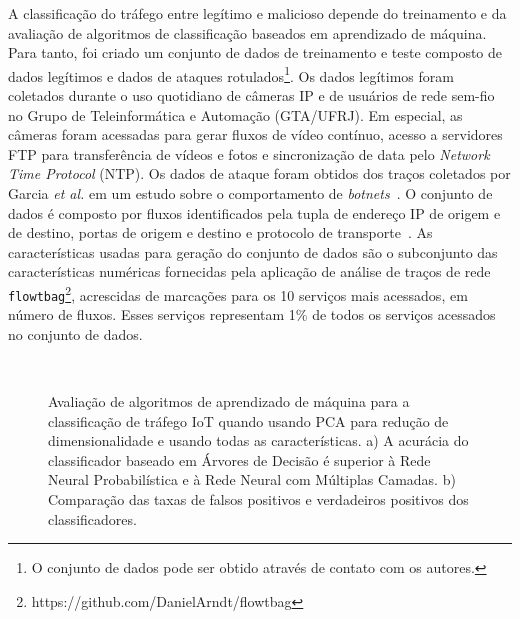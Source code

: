 \documentclass[12pt]{article}
\begin{document}
A classificação do tráfego entre legítimo e malicioso depende do treinamento e da avaliação de algoritmos de classificação baseados em aprendizado de máquina. Para tanto, foi criado um conjunto de dados de treinamento e teste composto de dados legítimos e dados de ataques rotulados\footnote{O conjunto de dados pode ser obtido através de contato com os autores.}. Os dados legítimos foram coletados durante o uso quotidiano de câmeras IP e de usuários de rede sem-fio no Grupo de Teleinformática e Automação (GTA/UFRJ). Em especial, as câmeras foram acessadas para gerar fluxos de vídeo contínuo, acesso a servidores FTP para transferência de vídeos e fotos e sincronização de data pelo {\it Network Time Protocol} (NTP). Os dados de ataque foram obtidos dos traços coletados por Garcia {\it et al.} em um estudo sobre o comportamento de \textit{botnets}~\cite{botnet}. O conjunto de dados é composto por fluxos identificados pela tupla de endereço IP de origem e de destino, portas de origem e destino e protocolo de transporte~\cite{csnet-martin}. 
As características usadas para geração do conjunto de dados são o subconjunto das características numéricas fornecidas pela aplicação de análise de traços de rede \texttt{flowtbag}\footnote{https://github.com/DanielArndt/flowtbag}, acrescidas de marcações para os 10 serviços mais acessados, em número de fluxos. Esses serviços representam 1\% de todos os serviços acessados no conjunto de dados.

\begin{figure*}[tb!]
\begin{center}
\hspace{-3mm}
\mbox{
}
\hspace{-3mm}
\mbox{
}
\end{center}
\vspace{-3mm}
\caption{Avaliação de algoritmos de aprendizado de máquina para a classificação de tráfego IoT quando usando PCA para redução de dimensionalidade e usando todas as características. a) A acurácia do classificador baseado em Árvores de Decisão é superior à Rede Neural Probabilística e à Rede Neural com Múltiplas Camadas. b) Comparação das taxas de falsos positivos e verdadeiros positivos dos classificadores. %
\vspace{-3mm}
}
\end{figure*}
\end{document}
